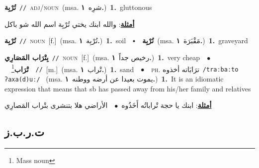 \documentclass[10pt,a4paper,twoside]{article} %
\begin{document}
\begin{multicols}{2}
{{{{\setlength\topsep{0pt}\textbf{\foreignlanguage{arabic}{تُرْبِة}}\ {\color{gray}\texttt{//}\color{black}}\ \textsc{adj/noun}\ \color{gray}(msa. \foreignlanguage{arabic}{شرِه}~\foreignlanguage{arabic}{\textbf{١.}})\color{black}\ \textbf{1.}~gluttonous\  \begin{flushright}\color{gray}\foreignlanguage{arabic}{\textbf{\underline{\foreignlanguage{arabic}{أمثلة}}}: والله ابنك يختي تُرْبِة اسم الله شو باكل}\end{flushright}\color{black}} \vspace{2mm}

{\setlength\topsep{0pt}\textbf{\foreignlanguage{arabic}{تُرْبِة}}\ {\color{gray}\texttt{//}\color{black}}\ \textsc{noun}\ [f.]\ \color{gray}(msa. \foreignlanguage{arabic}{تُرْبِة}~\foreignlanguage{arabic}{\textbf{١.}})\color{black}\ \textbf{1.}~soil\ \ $\smblkdiamond$\ \ \setlength\topsep{0pt}\textbf{\foreignlanguage{arabic}{تُرْبِة}}\ \color{gray}(msa. \foreignlanguage{arabic}{مَقْبَرَة}~\foreignlanguage{arabic}{\textbf{١.}})\color{black}\ \textbf{1.}~graveyard\ 

{\setlength\topsep{0pt}\textbf{\foreignlanguage{arabic}{بِتْرَاب المَصَارِي}}\ {\color{gray}\texttt{//}\color{black}}\ \textsc{noun}\ [f.]\ \color{gray}(msa. \foreignlanguage{arabic}{رخيص جداً}~\foreignlanguage{arabic}{\textbf{١.}})\color{black}\ \textbf{1.}~very cheap\ \ $\bullet$\ \ \setlength\topsep{0pt}\textbf{\foreignlanguage{arabic}{تْرَاب}}\footnote{Mass noun}\ \ {\color{gray}\texttt{//}\color{black}}\ [m.]\ \color{gray}(msa. \foreignlanguage{arabic}{تْراب}~\foreignlanguage{arabic}{\textbf{١.}})\color{black}\ \textbf{1.}~sand\ \ $\bullet$\ \ \textsc{ph.} \color{gray} \foreignlanguage{arabic}{ترَابَاته أخذوه}\color{black}\ {\color{gray}\texttt{/{\sffamily traːbaːto ʔaxa(d)uː}/}\color{black}}\ \color{gray} (msa. \foreignlanguage{arabic}{يموت بعيدا عن أرضه ووطنه}~\foreignlanguage{arabic}{\textbf{١.}})\color{black}\ \textbf{1.}~It is an idiomatic expression that means that sb has passed away from his/her family and relatives\  \begin{flushright}\color{gray}\foreignlanguage{arabic}{\textbf{\underline{\foreignlanguage{arabic}{أمثلة}}}: ابنك يا حجة تْراباتُه أَخَذُوه\ $\bullet$\ \  الأراضي هلا بتنشرى بتْراب المَصارِي}\end{flushright}\color{black}} \vspace{2mm}

\vspace{-3mm}
\subsection*{\color{blue}\foreignlanguage{arabic}{ت.ر.ب.ز}\color{blue}{ (ntws)}} 

}}}}
\end{multicols}
\end{document}
